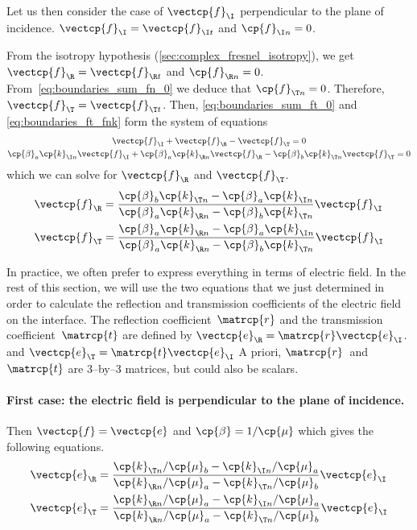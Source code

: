 \begin{refsection}
Let us then consider the case of $\vectcp{f}_\I$ perpendicular to the plane of incidence.
$\vectcp{f}_\I=\vectcp{f}_{\I t}$ and $\cp{f}_{\I n}=0$.

From the isotropy hypothesis (\cref{sec:complex_fresnel_isotropy}), we get $\vectcp{f}_\R=\vectcp{f}_{\R t}$ and $\cp{f}_{\R n}=0$.
From~\cref{eq:boundaries_sum_fn_0} we deduce that $\cp{f}_{\T n}=0$.
Therefore, $\vectcp{f}_\T=\vectcp{f}_{\T t}$.
Then, \cref{eq:boundaries_sum_ft_0} and \cref{eq:boundaries_ft_fnk} form the system of equations
\begin{gather}
    \vectcp{f}_\I
    +
    \vectcp{f}_\R
    -
    \vectcp{f}_\T
    = 0
    \\
    \cp{\beta}_a \cp{k}_{\I n} \vectcp{f}_\I
    +
    \cp{\beta}_a \cp{k}_{\R n} \vectcp{f}_\R
    -
    \cp{\beta}_b \cp{k}_{\T n} \vectcp{f}_\T
    =
    0
\end{gather}
which we can solve for $\vectcp{f}_\R$ and $\vectcp{f}_\T$.
\begin{align}
    \vectcp{f}_\R
    &=
    \frac{
        \cp{\beta}_b \cp{k}_{\T n} - \cp{\beta}_a \cp{k}_{\I n}
    }{
        \cp{\beta}_a \cp{k}_{\R n} - \cp{\beta}_b \cp{k}_{\T n}
    }
    \vectcp{f}_\I
    \\
    \vectcp{f}_\T
    &=
    \frac{
        \cp{\beta}_a \cp{k}_{\R n} - \cp{\beta}_a \cp{k}_{\I n}
    }{
        \cp{\beta}_a \cp{k}_{\R n} - \cp{\beta}_b \cp{k}_{\T n}
    }
    \vectcp{f}_\I
\end{align}

In practice, we often prefer to express everything in terms of electric field.
In the rest of this section, we will use the two equations that we just determined in order to calculate the reflection and transmission coefficients of the electric field on the interface.
The reflection coefficient~$\matrcp{r}$ and the transmission coefficient~$\matrcp{t}$ are defined by
$\vectcp{e}_\R = \matrcp{r} \vectcp{e}_\I$.
and
$\vectcp{e}_\T = \matrcp{t} \vectcp{e}_\I$
A priori, $\matrcp{r}$~and $\matrcp{t}$ are 3--by--3 matrices, but could also be scalars.


\paragraph{First case: the electric field is perpendicular to the plane of incidence.}
Then $\vectcp{f}=\vectcp{e}$ and $\cp{\beta}=1/\cp{\mu}$ which gives the following equations.
\begin{align}
    \vectcp{e}_\R
    &=
    \frac{
        \cp{k}_{\T n} / \cp{\mu}_b - \cp{k}_{\I n} / \cp{\mu}_a
    }{
        \cp{k}_{\R n} / \cp{\mu}_a - \cp{k}_{\T n} / \cp{\mu}_b
    }
    \vectcp{e}_\I
    \\
    \vectcp{e}_\T
    &=
    \frac{
        \cp{k}_{\R n} / \cp{\mu}_a - \cp{k}_{\I n} / \cp{\mu}_a
    }{
        \cp{k}_{\R n} / \cp{\mu}_a - \cp{k}_{\T n} / \cp{\mu}_b
    }
    \vectcp{e}_\I
\end{align}


\end{refsection}
